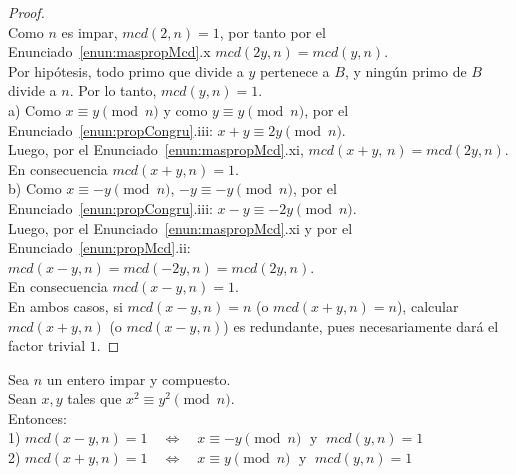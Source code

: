 \begin{proof} \, \\
Como $n$ es impar, $mcd(2,n)=1$, por tanto por el Enunciado~\ref{enun:maspropMcd}.x $mcd(2y,n)=mcd(y,n)$. \\
Por hipótesis, todo primo que divide a $y$ pertenece a $B$, y ningún primo de $B$ divide a $n$. Por lo tanto, $mcd(y,n)=1$. \\
a) Como $x \equiv y\pmod n$ y como $y \equiv y \pmod n$, por el Enunciado~\ref{enun:propCongru}.iii: $x+y\equiv 2y\pmod n$. \\
Luego, por el Enunciado~\ref{enun:maspropMcd}.xi, $mcd(x+y,\, n)=mcd(2y,n)$. \\
En consecuencia $mcd(x+y,n)=1$. \\
b) Como $x \equiv -y \pmod n$, $-y \equiv -y \pmod n$, por el Enunciado~\ref{enun:propCongru}.iii: $x-y \equiv -2y\pmod n$. \\
Luego, por el Enunciado~\ref{enun:maspropMcd}.xi y por el Enunciado~\ref{enun:propMcd}.ii: \\
$mcd(x-y,n)=mcd(-2y,n)=mcd(2y,n)$. \\
En consecuencia $mcd(x-y,n)=1$. \\
En ambos casos, si $mcd(x-y,n)=n$ (o $mcd(x+y,n)=n$), calcular $mcd(x+y,n)$ (o $mcd(x-y,n)$) es redundante, pues necesariamente dará el factor trivial $1$.
\end{proof}

\begin{enunciado}\label{enun:congrEsteril3}\leavevmode\par
Sea $n$ un entero impar y compuesto. \\
Sean $x, y$ tales que $x^2 \equiv y^2 \pmod n$. \\
Entonces: \\
1) $mcd(x-y, n) = 1 \quad\Longleftrightarrow\quad x \equiv -y \pmod n \;\text{ y }\; mcd(y,n)=1$ \\
2) $mcd(x+y, n) = 1 \quad\Longleftrightarrow\quad x \equiv y \pmod n \;\text{ y }\; mcd(y,n)=1$
\end{enunciado}

